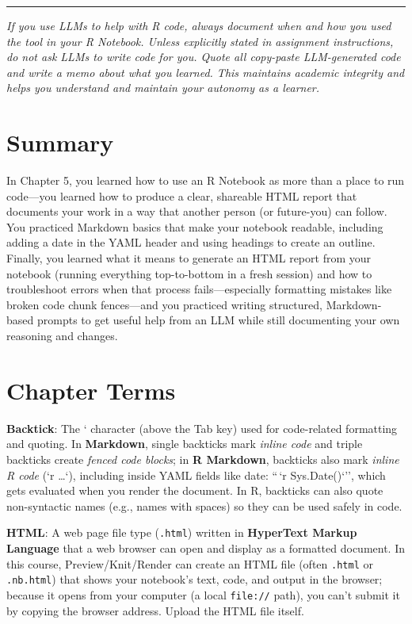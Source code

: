 \documentclass[
  12pt,
]{scrreprt}
\begin{document}
\begin{center}\rule{0.5\linewidth}{0.5pt}\end{center}

\emph{If you use LLMs to help with R code, always document when and how
you used the tool in your R Notebook. Unless explicitly stated in
assignment instructions, do not ask LLMs to write code for you. Quote
all copy-paste LLM-generated code and write a memo about what you
learned. This maintains academic integrity and helps you understand and
maintain your autonomy as a learner.}

\chapter{Summary}\label{summary}

In Chapter 5, you learned how to use an R Notebook as more than a place
to run code---you learned how to produce a clear, shareable HTML report
that documents your work in a way that another person (or future-you)
can follow. You practiced Markdown basics that make your notebook
readable, including adding a date in the YAML header and using headings
to create an outline. Finally, you learned what it means to generate an
HTML report from your notebook (running everything top-to-bottom in a
fresh session) and how to troubleshoot errors when that process
fails---especially formatting mistakes like broken code chunk
fences---and you practiced writing structured, Markdown-based prompts to
get useful help from an LLM while still documenting your own reasoning
and changes.

\chapter{Chapter Terms}\label{chapter-terms}

\textbf{Backtick}: The ` character (above the Tab key) used for
code-related formatting and quoting. In \textbf{Markdown}, single
backticks mark \emph{inline code} and triple backticks create
\emph{fenced code blocks}; in \textbf{R Markdown}, backticks also mark
\emph{inline R code} (`r \ldots`), including inside YAML fields like
date: ``\,`r Sys.Date()`'', which gets evaluated when you render the
document. In R, backticks can also quote non-syntactic names (e.g.,
names with spaces) so they can be used safely in code.

\textbf{HTML}: A web page file type (\texttt{.html}) written in
\textbf{HyperText Markup Language} that a web browser can open and
display as a formatted document. In this course, Preview/Knit/Render can
create an HTML file (often \texttt{.html} or \texttt{.nb.html}) that
shows your notebook's text, code, and output in the browser; because it
opens from your computer (a local \texttt{file://} path), you can't
submit it by copying the browser address. Upload the HTML file itself.
\end{document}
